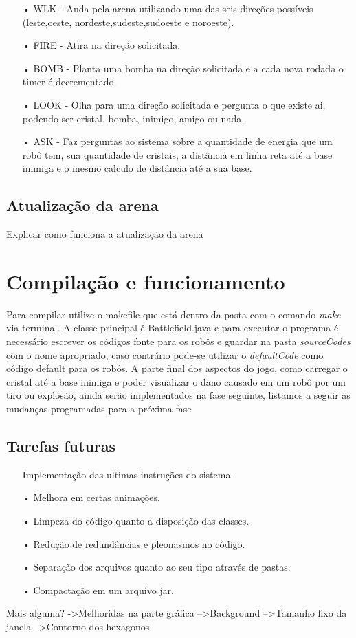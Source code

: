 \documentclass[a4paper]{article}
\begin{document}
\begin{itemize}
\item[•]{WLK - Anda pela arena utilizando uma das seis direções possíveis (leste,oeste, nordeste,sudeste,sudoeste e noroeste).}
\item[•]{FIRE - Atira na direção solicitada.}
\item[•]{BOMB - Planta uma bomba na direção solicitada e a cada nova rodada o timer é decrementado.}
\item[•]{LOOK - Olha para uma direção solicitada e pergunta o que existe ai, podendo ser cristal, bomba, inimigo, amigo ou nada.}
\item[•]{ASK - Faz perguntas ao sistema sobre a quantidade de energia que um robô tem, sua quantidade de cristais, a distância em linha reta até a base inimiga e o mesmo calculo de distância até a sua base.}
\end{itemize}
\subsection{Atualização da arena}
Explicar como funciona a atualização da arena

\section{Compilação e funcionamento}
Para compilar utilize o makefile que está dentro da pasta com o comando \textit{make} via terminal. A classe principal é Battlefield.java e para executar o programa é necessário escrever os códigos fonte para os robôs e guardar na pasta \textit{sourceCodes} com o nome apropriado, caso contrário pode-se utilizar o \textit{defaultCode} como código default para os robôs. A parte final dos aspectos do jogo, como carregar o cristal até a base inimiga e poder visualizar o dano causado em um robô por um tiro ou explosão, ainda serão implementados na fase seguinte, listamos a seguir as mudanças programadas para a próxima fase


\subsection{Tarefas futuras}
\begin{itemize}
\item[]{Implementação das ultimas instruções do sistema.}
\item[•]{Melhora em certas animações.}
\item[•]{Limpeza do código quanto a disposição das classes.}
\item[•]{Redução de redundâncias e pleonasmos no código.}
\item[•]{Separação dos arquivos quanto ao seu tipo através de pastas.}
\item[•]{Compactação em um arquivo jar.}
\end{itemize}

Mais alguma?
->Melhoridas na parte gráfica
	-->Background
	-->Tamanho fixo da janela
	-->Contorno dos hexagonos
\end{document}
